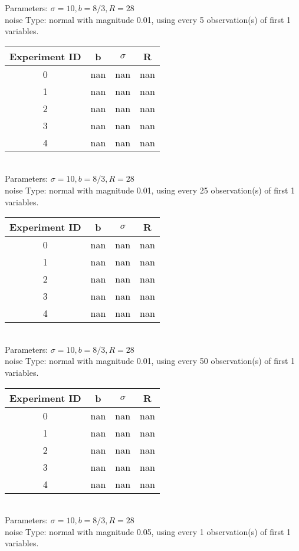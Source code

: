 \begin{multicols}{3}
Parameters: $\sigma=10, b=8/3, R=28$\\
noise Type: normal with magnitude 0.01, using every 5 observation(s) of first 1 variables.\\
\begin{tabular}{cccc}
\hline Experiment ID & b & $\sigma$ & R \\ \hline 
0 & nan & nan & nan\\ \hline 
 1 & nan & nan & nan\\ \hline 
 2 & nan & nan & nan\\ \hline 
 3 & nan & nan & nan\\ \hline 
 4 & nan & nan & nan\\ \hline 
 \end{tabular}\\
Parameters: $\sigma=10, b=8/3, R=28$\\
noise Type: normal with magnitude 0.01, using every 25 observation(s) of first 1 variables.\\
\begin{tabular}{cccc}
\hline Experiment ID & b & $\sigma$ & R \\ \hline 
0 & nan & nan & nan\\ \hline 
 1 & nan & nan & nan\\ \hline 
 2 & nan & nan & nan\\ \hline 
 3 & nan & nan & nan\\ \hline 
 4 & nan & nan & nan\\ \hline 
 \end{tabular}\\
Parameters: $\sigma=10, b=8/3, R=28$\\
noise Type: normal with magnitude 0.01, using every 50 observation(s) of first 1 variables.\\
\begin{tabular}{cccc}
\hline Experiment ID & b & $\sigma$ & R \\ \hline 
0 & nan & nan & nan\\ \hline 
 1 & nan & nan & nan\\ \hline 
 2 & nan & nan & nan\\ \hline 
 3 & nan & nan & nan\\ \hline 
 4 & nan & nan & nan\\ \hline 
 \end{tabular}\\
Parameters: $\sigma=10, b=8/3, R=28$\\
noise Type: normal with magnitude 0.05, using every 1 observation(s) of first 1 variables.\\

\end{multicols}

